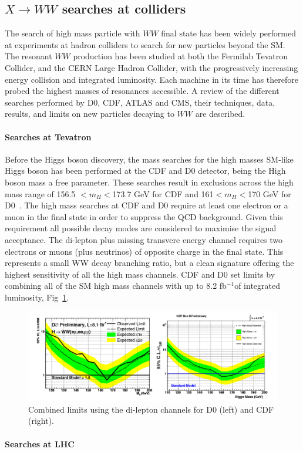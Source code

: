 \subsection*{$X \to WW$ searches at colliders}
The search of high mass particle with  $WW$ final state  has been widely performed at experiments at hadron
colliders to search for new particles beyond the SM. 
The resonant $WW$ production has been studied at both the Fermilab Tevatron Collider, and the CERN Large
Hadron Collider, with the progressively increasing energy collision and integrated
luminosity. Each machine in its time has therefore probed the highest masses of
 resonances accessible. A review of the different searches
performed by D0, CDF, ATLAS and CMS, their techniques, data, results, and
limits on new particles decaying to $WW$ are described. 

\paragraph{Searches at Tevatron} Before the Higgs boson discovery, the mass  searches for the high masses SM-like Higgs boson has been performed at the CDF
and D0 detector, being the High boson mass a free parameter. 
These searches result in exclusions across the high mass range of 156.5 $<m_H<$173.7 GeV for CDF and 161$<m_H<$170 GeV for D0~\cite{Petridis:2012jd}. 
The high mass searches at CDF and D0 require at least one electron or a muon in the final state in order to suppress the QCD background. Given this requirement all possible decay  modes  are  considered  to  maximise  the  signal  acceptance. The di-lepton plus missing transvere energy channel requires two electrons or muons (plus neutrinos) of opposite charge in the final state. This represents a small WW decay branching ratio, but a clean signature offering the highest sensitivity  of  all  the  high  mass  channels. 
CDF and D0 set limits by combining all of the SM high mass channels with up to 8.2 fb$^{-1}$of integrated luminosity, Fig~\ref{tevatron}.

\begin{figure}
\centering
\includegraphics[scale= 0.33]{../Cap1/tevatron}
\caption{Combined limits using the di-lepton channels for D0 (left) and CDF (right).}
\label{tevatron}
\end{figure}

\paragraph{Searches at LHC}

